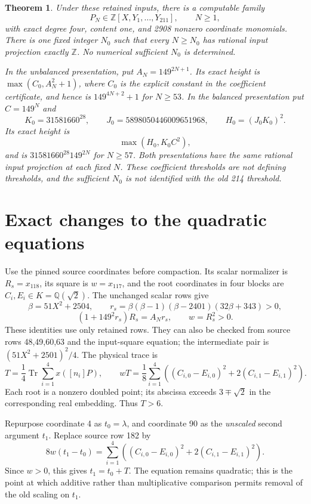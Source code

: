 \documentclass[11pt,a4paper]{article}
\newtheorem{theorem}{Theorem}[section]\newtheorem{lemma}[theorem]{Lemma}\newtheorem{proposition}[theorem]{Proposition}
\newcommand{\Q}{\mathbb Q}\newcommand{\Z}{\mathbb Z}\DeclareMathOperator{\Tr}{Tr}
\begin{document}
\begin{theorem}\label{thm:main}
Under these retained inputs, there is a computable family
\[P_N\in\Z[X,Y_1,\ldots,Y_{211}],\qquad N\ge1,\]
with exact degree four, content one, and 2908 nonzero coordinate
monomials. There is one fixed
integer $N_0$ such that every $N\ge N_0$ has rational input projection
exactly $\Z$. No numerical sufficient $N_0$ is determined.

In the unbalanced presentation, put $A_N=149^{2N+1}$. Its exact
height is $\max(C_0,A_N^2+1)$, where $C_0$ is the explicit constant in
the coefficient certificate, and hence is $149^{4N+2}+1$ for $N\ge53$.
In the balanced presentation put $C=149^N$ and
\[
 K_0=31581660^{28},\qquad J_0=5898050446009651968,\qquad
 H_0=(J_0K_0)^2.
\]
Its exact height is
\[
                    \max(H_0,K_0C^2),
\]
and is $31581660^{28}149^{2N}$ for $N\ge57$.
Both presentations have the same rational input projection at each
fixed $N$. These coefficient thresholds are not defining thresholds,
and the sufficient $N_0$ is not identified with the old 214 threshold.
\end{theorem}

\section{Exact changes to the quadratic equations}
Use the pinned source coordinates before compaction. Its scalar
normalizer is $R_s=x_{118}$, its square is $w=x_{117}$, and the root
coordinates in four blocks are $C_i,E_i\in K=\Q(\sqrt2)$.
The unchanged scalar rows give
\[
 \beta=51X^2+2504,\qquad
 r_s=\beta(\beta-1)(\beta-2401)(32\beta+343)>0,
\]
\[
       (1+149^2r_s)R_s=A_Nr_s,\qquad w=R_s^2>0.
\]
These identities use only retained rows. They can also be checked
from source rows 48,49,60,63 and the input-square equation; the
intermediate pair is $(51X^2+2501)^2/4$.
The physical trace is
\begin{equation}\label{eq:scale}
 T=\frac14\Tr\sum_{i=1}^4 x([n_i]P),\qquad
 wT=\frac18\sum_{i=1}^4\left((C_{i,0}-E_{i,0})^2
                          +2(C_{i,1}-E_{i,1})^2\right).
\end{equation}
Each root is a nonzero doubled point; its abscissa exceeds $3\mp\sqrt2$
in the corresponding real embedding. Thus $T>6$.

Repurpose coordinate 4 as $t_0=\lambda$, and coordinate 90 as the
\emph{unscaled} second argument $t_1$. Replace source row 182 by
\begin{equation}\label{eq:aggregate}
 8w(t_1-t_0)=\sum_{i=1}^4
       \left((C_{i,0}-E_{i,0})^2+2(C_{i,1}-E_{i,1})^2\right).
\end{equation}
Since $w>0$, this gives $t_1=t_0+T$. The equation remains quadratic;
this is the point at which additive rather than multiplicative
comparison permits removal of the old scaling on $t_1$.
\end{document}
